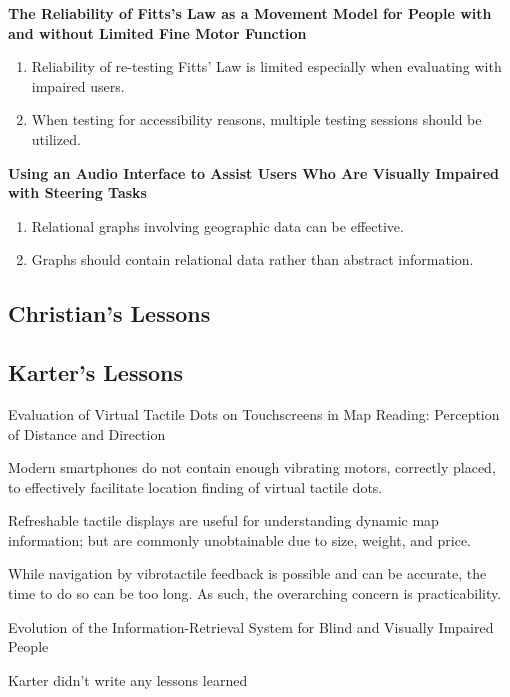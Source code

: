 \documentclass{article}
\begin{document}
\cite{} \textbf{The Reliability of Fitts’s Law as a Movement Model for People with and without Limited Fine Motor Function } \cite{}

\begin{enumerate}
    \item Reliability of re-testing Fitts' Law is limited especially when evaluating with impaired users. 
    \item When testing for accessibility reasons, multiple testing sessions should be utilized. 
\end{enumerate}

\cite{} \textbf{Using an Audio Interface to Assist Users Who Are Visually Impaired with Steering Tasks } \cite{}

\begin{enumerate}
    \item Relational graphs involving geographic data can be effective. 
    \item Graphs should contain relational data rather than abstract information. 
\end{enumerate}



\subsection{Christian's Lessons}




\subsection{Karter's Lessons}
Evaluation of Virtual Tactile Dots on Touchscreens in Map Reading: Perception of Distance and Direction 

Modern smartphones do not contain enough vibrating motors, correctly placed, to effectively facilitate location finding of virtual tactile dots. 

Refreshable tactile displays are useful for understanding dynamic map information; but are commonly unobtainable due to size, weight, and price. 

While navigation by vibrotactile feedback is possible and can be accurate, the time to do so can be too long. As such, the overarching concern is practicability. 

Evolution of the Information-Retrieval System for Blind and Visually Impaired People 

Karter didn’t write any lessons learned 
\end{document}
